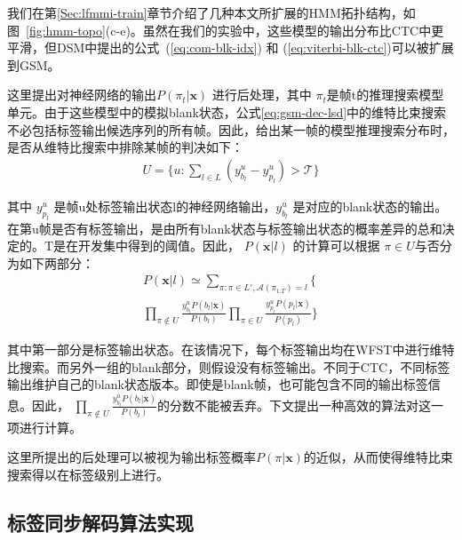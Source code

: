 我们在第\ref{Sec:lfmmi-train}章节介绍了几种本文所扩展的HMM拓扑结构，如图~\ref{fig:hmm-topo}(c-e)。虽然在我们的实验中，这些模型的输出分布比CTC中更平滑，但DSM中提出的公式~(\ref{eq:com-blk-idx}) 和 (\ref{eq:viterbi-blk-ctc})可以被扩展到GSM。


这里提出对神经网络的输出$P(\pi_t|\mathbf{x})$ 进行后处理，其中 $\pi_t $是帧t的推理搜索模型单元。由于这些模型中的模拟blank状态，公式\ref{eq:gsm-dec-lsd}中的维特比束搜索不必包括标签输出候选序列的所有帧。因此，给出某一帧的模型推理搜索分布时，是否从维特比搜索中排除某帧的判决如下：
  \begin{equation} 
       \label{eq:com-blk-idx-gsm}
       \begin{split}
U=\{u:\sum_{l\in L}(y^{u}_{b_l}-y^{u}_{p_l})> \mathcal{T}\}
\end{split}
\end{equation}


其中 $y^{u}_{p_l}$ 是帧u处标签输出状态l的神经网络输出，$y^{u}_{b_l}$ 是对应的blank状态的输出。在第u帧是否有标签输出，是由所有blank状态与标签输出状态的概率差异的总和决定的。T是在开发集中得到的阈值。因此， $P(\mathbf{x}|l)$  的计算可以根据 $\pi\in U$与否分为如下两部分：
\begin{equation} \label{eq:viterbi-blk-hmm2}
  \begin{split}
P(\mathbf{x}|l)
\simeq\sum_{\pi:\pi \in L',\mathcal{A}(\pi_{1\mathord{:}T})=l}
         \{\   \\ %
         \prod_{\pi\not\in U}\frac{y_{b_l}^u P(b_l|\mathbf{x})}{P(b_l)} \prod_{\pi\in U}\frac{y_{p_l}^u P(p_l|\mathbf{x})}{P(p_l)}
         \}
         \end{split}
       \end{equation}   


其中第一部分是标签输出状态。在该情况下，每个标签输出均在WFST中进行维特比搜索。而另外一组的blank部分，则假设没有标签输出。不同于CTC，不同标签输出维护自己的blank状态版本。即使是blank帧，也可能包含不同的输出标签信息。因此， $\prod_{\pi\not\in U}\frac{y_{b_l}^u P(b_l|\mathbf{x})}{P(b_l)}$的分数不能被丢弃。下文提出一种高效的算法对这一项进行计算。

这里所提出的后处理可以被视为输出标签概率$P(\pi|\mathbf{x})$的近似，从而使得维特比束搜索得以在标签级别上进行。


\subsection{标签同步解码算法实现}
\label{chap:lsd-lsd-hmm-alg}


